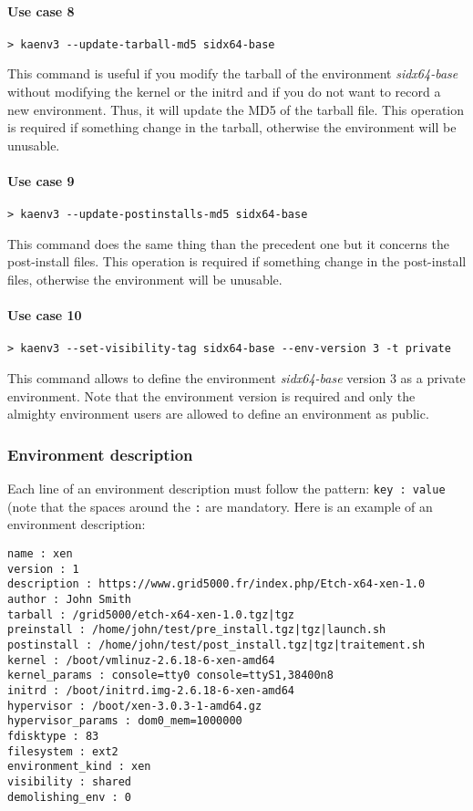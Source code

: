 \documentclass[a4wide,10pt,oneside]{book}
\begin{document}
\paragraph{Use case 8}
\begin{verbatim}
> kaenv3 --update-tarball-md5 sidx64-base
\end{verbatim}
This command is useful if you modify the tarball of the environment \textit{sidx64-base} without modifying the kernel or the initrd and if you do not want to record a new environment. Thus, it will update the MD5 of the tarball file. This operation is required if something change in the tarball, otherwise the environment will be unusable.

\paragraph{Use case 9}
\begin{verbatim}
> kaenv3 --update-postinstalls-md5 sidx64-base
\end{verbatim}
This command does the same thing than the precedent one but it concerns the post-install files. This operation is required if something change in the post-install files, otherwise the environment will be unusable.

\paragraph{Use case 10}
\begin{verbatim}
> kaenv3 --set-visibility-tag sidx64-base --env-version 3 -t private
\end{verbatim}
This command allows to define the environment \textit{sidx64-base} version 3 as a private environment. Note that the environment version is required and only the almighty environment users are allowed to define an environment as public.

\subsubsection{Environment description}\label{sec:env_desc}
Each line of an environment description must follow the pattern: \texttt{key : value} (note that the spaces around the \texttt{:} are mandatory.
Here is an example of an environment description:
\begin{small}
\begin{verbatim}
name : xen
version : 1
description : https://www.grid5000.fr/index.php/Etch-x64-xen-1.0
author : John Smith
tarball : /grid5000/etch-x64-xen-1.0.tgz|tgz
preinstall : /home/john/test/pre_install.tgz|tgz|launch.sh
postinstall : /home/john/test/post_install.tgz|tgz|traitement.sh
kernel : /boot/vmlinuz-2.6.18-6-xen-amd64
kernel_params : console=tty0 console=ttyS1,38400n8
initrd : /boot/initrd.img-2.6.18-6-xen-amd64
hypervisor : /boot/xen-3.0.3-1-amd64.gz
hypervisor_params : dom0_mem=1000000
fdisktype : 83
filesystem : ext2
environment_kind : xen
visibility : shared
demolishing_env : 0
\end{verbatim}
\end{small}
\end{document}
